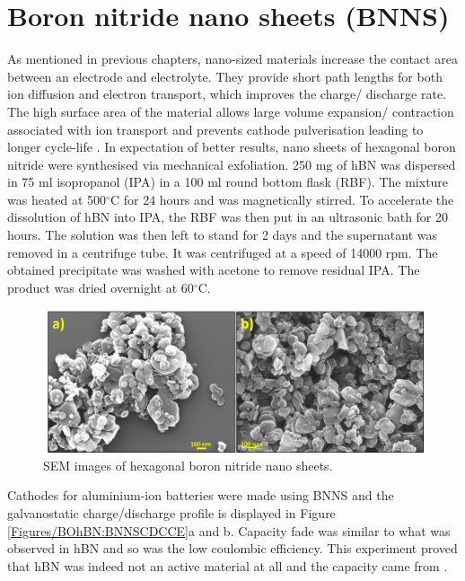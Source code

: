 \section*{Boron nitride nano sheets (BNNS)}
As mentioned in previous chapters, nano-sized materials increase the contact area between an electrode and electrolyte. They provide short path lengths for both ion diffusion and electron transport, which improves the charge/ discharge rate. The high surface area of the material allows large volume expansion/ contraction associated with ion transport and prevents cathode pulverisation leading to longer cycle-life \cite{zhang_ultrathin_2015,  cong_intrinsic_2015}. 
In expectation of better results, nano sheets of hexagonal boron nitride were synthesised via mechanical exfoliation.
250 mg of hBN was dispersed in 75 ml isopropanol (IPA) in a 100 ml round bottom flask (RBF). The mixture was heated at 500$^{\circ}$C for 24 hours and was magnetically stirred. To accelerate the dissolution of hBN into IPA, the RBF was then put in an ultrasonic bath for 20 hours. The solution was then left to stand for 2 days and the supernatant was removed in a centrifuge tube. It was centrifuged at a speed of 14000 rpm. The obtained precipitate was washed with acetone to remove residual IPA. The product was dried overnight at 60$^{\circ}$C. 

\begin{figure}[tbh!]
\centering
\includegraphics[width=\textwidth]{Figures/BOhBN/BNNSSEM}
\caption{SEM images of hexagonal boron nitride nano sheets.}
\label{Figures/BOhBN:BNNSSEM}
\end{figure}

Cathodes for aluminium-ion batteries were made using BNNS and the galvanostatic charge/discharge profile is displayed in Figure \ref{Figures/BOhBN:BNNSCDCCE}a and b. Capacity fade was similar to what was observed in hBN and so was the low coulombic efficiency. This experiment proved that hBN was indeed not an active material at all and the capacity came from . 

